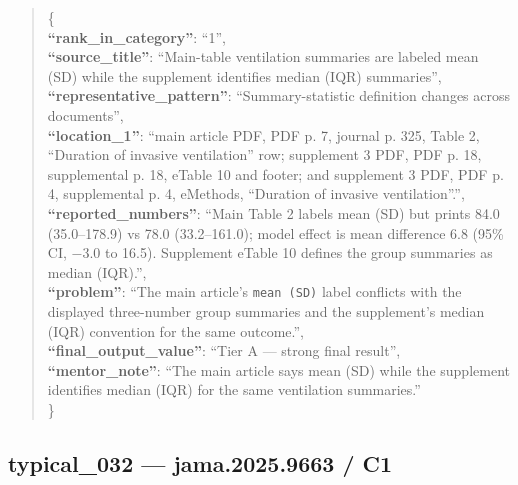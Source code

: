 \documentclass[
  letterpaper,
  9pt]{extreport}
\begin{document}
\begin{quote}
\{\\
\textbf{``rank\_in\_category''}: ``1'',\\
\textbf{``source\_title''}: ``Main-table ventilation summaries are
labeled mean (SD) while the supplement identifies median (IQR)
summaries'',\\
\textbf{``representative\_pattern''}: ``Summary-statistic definition
changes across documents'',\\
\textbf{``location\_1''}: ``main article PDF, PDF p. 7, journal p. 325,
Table 2, ``Duration of invasive ventilation'' row; supplement 3 PDF, PDF
p. 18, supplemental p. 18, eTable 10 and footer; and supplement 3 PDF,
PDF p. 4, supplemental p. 4, eMethods, ``Duration of invasive
ventilation''.'',\\
\textbf{``reported\_numbers''}: ``Main Table 2 labels mean (SD) but
prints 84.0 (35.0--178.9) vs 78.0 (33.2--161.0); model effect is mean
difference 6.8 (95\% CI, −3.0 to 16.5). Supplement eTable 10 defines the
group summaries as median (IQR).'',\\
\textbf{``problem''}: ``The main article's \texttt{mean\ (SD)} label
conflicts with the displayed three-number group summaries and the
supplement's median (IQR) convention for the same outcome.'',\\
\textbf{``final\_output\_value''}: ``Tier A --- strong final result'',\\
\textbf{``mentor\_note''}: ``The main article says mean (SD) while the
supplement identifies median (IQR) for the same ventilation
summaries.''\\
\}
\end{quote}

\hypertarget{typical_032--jama20259663--c1}{%
\subsection{typical\_032 --- jama.2025.9663 /
C1}\label{typical_032--jama20259663--c1}}
\end{document}
